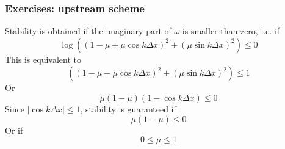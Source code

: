\documentclass[aspectratio=43,9pt]{beamer}
\begin{document}
\begin{frame}
	\frametitle{Exercises: upstream scheme}
	Stability is obtained if the imaginary part of $\omega$ is smaller than zero, i.e. if
	\begin{equation*}
		\log\left(\left(1-\mu+\mu\cos k\Delta x\right)^2+\left(\mu\sin k\Delta x\right)^2\right) \leq 0
	\end{equation*}
\pause
	This is equivalent to
	\begin{equation*}
		\left(\left(1-\mu+\mu\cos k\Delta x\right)^2+\left(\mu\sin k\Delta x\right)^2\right) \leq 1
	\end{equation*}
\pause
	Or
	\begin{equation*}
		\mu(1-\mu)(1-\cos k\Delta x) \leq 0
	\end{equation*}
\pause
	Since $|\cos k\Delta x|\leq 1$, stability is guaranteed if
	\begin{equation*}
		\mu(1-\mu) \leq 0
	\end{equation*}
\pause
	Or if
	\begin{equation*}
		0\leq \mu\leq 1
	\end{equation*}
\end{frame}
%
%
\end{document}
